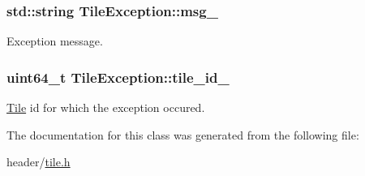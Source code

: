 \subsubsection[{msg\+\_\+}]{\setlength{\rightskip}{0pt plus 5cm}std\+::string Tile\+Exception\+::msg\+\_\+\hspace{0.3cm}{\ttfamily [private]}}\label{classTileException_a9197fbc5c85ba25009fae1e88b7f5881}
Exception message. \hypertarget{classTileException_a9ff5e438cc1446df9a27bbf85e109e16}{}
\subsubsection[{tile\+\_\+id\+\_\+}]{\setlength{\rightskip}{0pt plus 5cm}uint64\+\_\+t Tile\+Exception\+::tile\+\_\+id\+\_\+\hspace{0.3cm}{\ttfamily [private]}}\label{classTileException_a9ff5e438cc1446df9a27bbf85e109e16}
\hyperlink{classTile}{Tile} id for which the exception occured. 

The documentation for this class was generated from the following file\+:\begin{DoxyCompactItemize}
\item 
header/\hyperlink{tile_8h}{tile.\+h}\end{DoxyCompactItemize}
